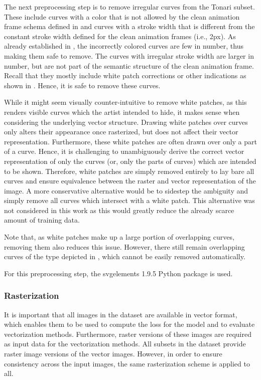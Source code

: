 The next preprocessing step is to remove irregular curves from the Tonari subset. These include curves with a color that is not allowed by the clean animation frame schema defined in  and curves with a stroke width that is different from the constant stroke width defined for the clean animation frames (i.e., 2px). As already established in , the incorrectly colored curves are few in number, thus making them safe to remove. The curves with irregular stroke width are larger in number, but are not part of the semantic structure of the clean animation frame. Recall that they mostly include white patch corrections or other indications as shown in . Hence, it is safe to remove these curves.

While it might seem visually counter-intuitive to remove white patches, as this renders visible curves which the artist intended to hide, it makes sense when considering the underlying vector structure. Drawing white patches over curves only alters their appearance once rasterized, but does not affect their vector representation. Furthermore, these white patches are often drawn over only a part of a curve. Hence, it is challenging to unambiguously derive the correct vector representation of only the curves (or, only the parts of curves) which are intended to be shown. Therefore, white patches are simply removed entirely to lay bare all curves and ensure equivalence between the raster and vector representation of the image. A more conservative alternative would be to sidestep the ambiguity and simply remove all curves which intersect with a white patch. This alternative was not considered in this work as this would greatly reduce the already scarce amount of training data.

Note that, as white patches make up a large portion of overlapping curves, removing them also reduces this issue. However, there still remain overlapping curves of the type depicted in , which cannot be easily removed automatically.

For this preprocessing step, the svgelements 1.9.5 \cite{svgelements} Python package is used.

\subsubsection{Rasterization}

It is important that all images in the dataset are available in vector format, which enables them to be used to compute the loss for the model and to evaluate vectorization methods. Furthermore, raster versions of these images are required as input data for the vectorization methods. All subsets in the dataset provide raster image versions of the vector images. However, in order to ensure consistency across the input images, the same rasterization scheme is applied to all.

